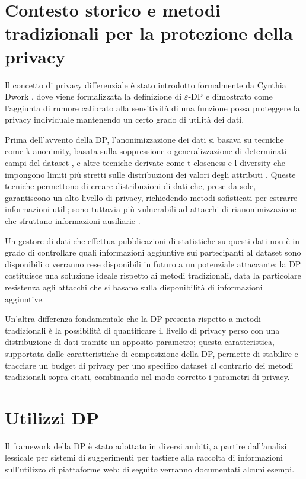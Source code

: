 \section{Contesto storico e metodi tradizionali per la protezione della privacy}
Il concetto di privacy differenziale è stato introdotto formalmente da Cynthia Dwork \cite{10.1007/11681878_14}, dove viene formalizzata la definizione di $\varepsilon$-DP e dimostrato come l'aggiunta di rumore calibrato alla sensitività di una funzione possa proteggere la privacy individuale mantenendo un certo grado di utilità dei dati.

Prima dell'avvento della DP, l'anonimizzazione dei dati si basava su tecniche come k-anonimity, basata sulla soppressione o generalizzazione di determinati campi del dataset \cite{kanon}, e altre tecniche derivate come t-closeness e l-diversity che impongono limiti più stretti sulle distribuzioni dei valori degli attributi \cite{tClosenesslDiversity}. Queste tecniche permettono di creare distribuzioni di dati che, prese da sole, garantiscono un alto livello di privacy, richiedendo metodi sofisticati per estrarre informazioni utili; sono tuttavia più vulnerabili ad attacchi di rianonimizzazione che sfruttano informazioni ausiliarie \cite{downcodingAtk}.

Un gestore di dati che effettua pubblicazioni di statistiche su questi dati non è in grado di controllare quali informazioni aggiuntive sui partecipanti al dataset sono disponibili o verranno rese disponibili in futuro a un potenziale attaccante; la DP costituisce una soluzione ideale rispetto ai metodi tradizionali, data la particolare resistenza agli attacchi che si basano sulla disponibilità di informazioni aggiuntive.

Un'altra differenza fondamentale che la DP presenta rispetto a metodi tradizionali è la possibilità di quantificare il livello di privacy perso con una distribuzione di dati tramite un apposito parametro; questa caratteristica, supportata dalle caratteristiche di composizione della DP\cite{dpComposition}, permette di stabilire e tracciare un budget di privacy per uno specifico dataset al contrario dei metodi tradizionali sopra citati, combinando nel modo corretto i parametri di privacy.

\section{Utilizzi DP}
Il framework della DP è stato adottato in diversi ambiti, a partire dall'analisi lessicale per sistemi di suggerimenti per tastiere alla raccolta di informazioni sull'utilizzo di piattaforme web; di seguito verranno documentati alcuni esempi.


